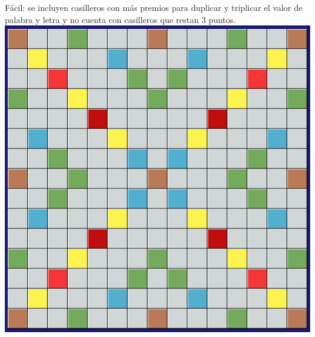 \documentclass[12pt]{article}
\begin{document}
Fácil: se incluyen casilleros con más premios para duplicar y triplicar el valor de palabra y letra y no cuenta con casilleros que restan 3 puntos.
\newline
\newline
\includegraphics[width=\textwidth]{images/facil.png}
\end{document}
